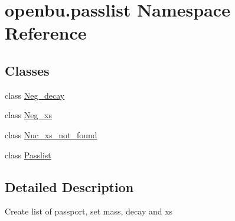 \hypertarget{namespaceopenbu_1_1passlist}{}\section{openbu.\+passlist Namespace Reference}
\label{namespaceopenbu_1_1passlist}
\subsection*{Classes}
\begin{DoxyCompactItemize}
\item 
class \mbox{\hyperlink{classopenbu_1_1passlist_1_1_neg__decay}{Neg\+\_\+decay}}
\item 
class \mbox{\hyperlink{classopenbu_1_1passlist_1_1_neg__xs}{Neg\+\_\+xs}}
\item 
class \mbox{\hyperlink{classopenbu_1_1passlist_1_1_nuc__xs__not__found}{Nuc\+\_\+xs\+\_\+not\+\_\+found}}
\item 
class \mbox{\hyperlink{classopenbu_1_1passlist_1_1_passlist}{Passlist}}
\end{DoxyCompactItemize}


\subsection{Detailed Description}
\begin{DoxyVerb}Create list of passport, set mass, decay and xs\end{DoxyVerb}
 